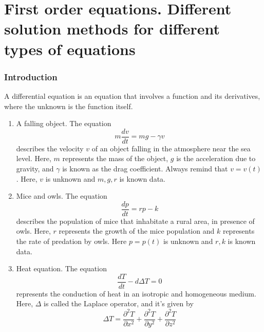 \documentclass[main.tex]{subfiles}
\begin{document}
\pagestyle{plain}
\setcounter{chapter}{0}

\chapter{First order equations. Different solution methods for different types of equations}
\label{chap:chapter1}
\subsection{Introduction}
A differential equation is an equation that involves a function and its derivatives, where the unknown is the function itself. 

\begin{example}
    \begin{enumerate}
        \item A falling object. The equation 
    \begin{equation}\label{eq:dropping}
        m\dfrac{dv}{dt} = mg - \gamma v
    \end{equation}
    describes the velocity $v$ of an object falling in the atmosphere near the sea level. Here, $m$ represents the mass of the object, $g$ is the acceleration due to gravity, and $\gamma$ is known as the drag coefficient. Always remind that $v = v(t)$. Here, $v$ is unknown and $m,g,r$ is known data.  
    \item Mice and owls. The equation 
    \begin{equation}
        \dfrac{dp}{dt} = rp - k
    \end{equation}
    describes the population of mice that inhabitate a rural area, in presence of owls. Here, $r$ represents the growth of the mice population and $k$ represents the rate of predation by owls. Here $p = p(t)$ is unknown and $r,k$ is known data. 
    \item Heat equation. The equation 
    \begin{equation}
        \dfrac{dT}{dt} - d \Delta T = 0
    \end{equation}
    represents the conduction of heat in an isotropic and homogeneous medium. Here, $\Delta$ is called the Laplace operator, and it's given by 
    \begin{equation}
        \Delta T = \dfrac{\partial^2 T}{\partial x^2} + \dfrac{\partial^2 T}{\partial y^2} + \dfrac{\partial^2 T}{\partial z^2}
    \end{equation}
    \end{enumerate}
\end{example}
\end{document}

